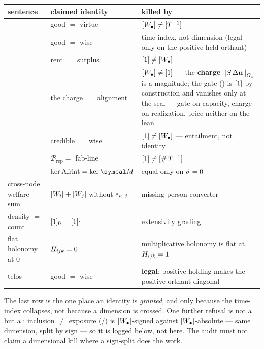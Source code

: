 \documentclass[../main]{subfiles}
\begin{document}
\begin{table}[htbp]
  \centering
  \begin{tabularx}{\textwidth}{@{} l L L @{}}
    \toprule
    \textbf{sentence} & \textbf{claimed identity} & \textbf{killed by} \\
    \midrule
     & good $=$ virtue & $[W\sb{\bullet}]\neq[T\sp{-1}]$ \\
     & good $=$ wise & time-index, not dimension (legal only on the positive held orthant) \\
     & rent $=$ surplus & $[1]\neq[W\sb{\bullet}]$ \\
     & the charge $=$ alignment
      & $[W\sb{\bullet}]\neq[1]$ --- the \textbf{charge}
        $\left\lVert S\,\Delta\mathbf{u} \right\rVert\sb{ \ensuremath{G\sb{\star}} }$ is a magnitude; the gate
        () is $[1]$ by construction and vanishes only at the seal ---
        gate on capacity, charge on realization, price neither on the lean \\
     & credible $=$ wise & $[1]\neq[W\sb{\bullet}]$ --- entailment, not identity \\
     & $\mathcal B_{\text{rep}}=$ fab-line & $[1]\neq[\#\,T\sp{-1}]$ \\
     & $\ker\text{Afriat}=\ker\readout$ & equal only on $\dot{\sigma}=0$ \\
    cross-node welfare sum & $[W\sb{i}]+[W\sb{j}]$ without $e\sb{ \ensuremath{i\!\leftarrow\!j} }$
      & missing person-converter \\
    density $=$ count & $[1]\sb{0}=[1]\sb{1}$ & extensivity grading \\
    flat holonomy at $0$ & $H\sb{ \ensuremath{ijk} }=0$ & multiplicative holonomy is flat at $H\sb{ \ensuremath{ijk} }=1$ \\
    telos & good $=$ wise & \textbf{legal}: positive holding makes the positive orthant diagonal \\
    \bottomrule
  \end{tabularx}
\end{table}

The last row is the one place an identity is \emph{granted}, and only because the time-index
collapses, not because a dimension is crossed. One further refusal is not a  but a
: inclusion $\ne$ exposure (/) is $[W\sb{\bullet}]$-signed
against $[W\sb{\bullet}]$-absolute --- same dimension, split by sign --- so it is logged below, not
here. The audit must not claim a dimensional kill where a sign-split does the work.
\end{document}
